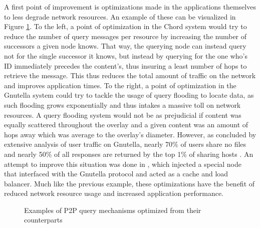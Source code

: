     A first point of improvement is optimizations made in the applications themselves to less degrade network resources.
    An example of these can be visualized in Figure \ref{fig:p2p-optimization}.
    To the left, a point of optimization in the Chord system would try to reduce the number of query messages per resource by increasing the number of successors a given node knows.
    That way, the querying node can instead query not for the single successor it knows, but instead by querying for the one who's ID immediately precedes the content's, thus insuring a least number of hops to retrieve the message.
    This thus reduces the total amount of traffic on the network and improves application times.
    To the right, a point of optimization in the Gnutella system could try to tackle the usage of query flooding to locate data, as such flooding grows exponentially and thus intakes a massive toll on network resources.
    A query flooding system would not be as prejudicial if content was equally scattered throughout the overlay and a given content was an amount of hops away which was average to the overlay's diameter.
    However, as concluded by extensive analysis of user traffic on Gnutella, nearly 70\% of users share no files and nearly 50\% of all responses are returned by the top 1\% of sharing hosts \cite{freeriding-gnutella}.
    An attempt to improve this situation was done in \cite{altruistic-gnutella}, which injected a special node that interfaced with the Gnutella protocol and acted as a cache and load balancer.
    Much like the previous example, these optimizations have the benefit of reduced network resource usage and increased application performance.

\begin{figure}%
\centering
{}%
\qquad
{}%
\caption{Examples of P2P query mechanisms optimized from their counterparts}
\label{fig:p2p-optimization}
\end{figure}

